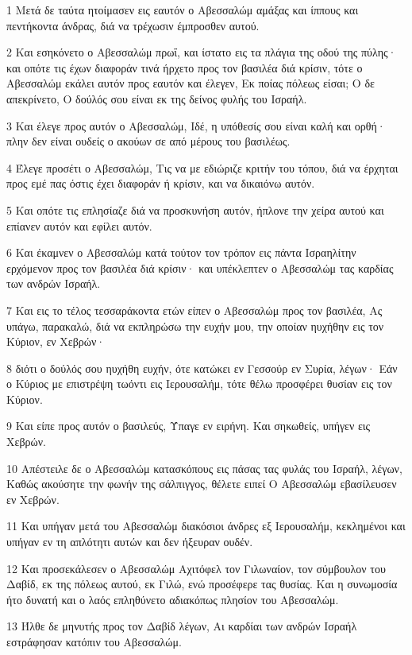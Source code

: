 \par 1 Μετά δε ταύτα ητοίμασεν εις εαυτόν ο Αβεσσαλώμ αμάξας και ίππους και πεντήκοντα άνδρας, διά να τρέχωσιν έμπροσθεν αυτού.
\par 2 Και εσηκόνετο ο Αβεσσαλώμ πρωΐ, και ίστατο εις τα πλάγια της οδού της πύλης· και οπότε τις έχων διαφοράν τινά ήρχετο προς τον βασιλέα διά κρίσιν, τότε ο Αβεσσαλώμ εκάλει αυτόν προς εαυτόν και έλεγεν, Εκ ποίας πόλεως είσαι; Ο δε απεκρίνετο, Ο δούλός σου είναι εκ της δείνος φυλής του Ισραήλ.
\par 3 Και έλεγε προς αυτόν ο Αβεσσαλώμ, Ιδέ, η υπόθεσίς σου είναι καλή και ορθή· πλην δεν είναι ουδείς ο ακούων σε από μέρους του βασιλέως.
\par 4 Έλεγε προσέτι ο Αβεσσαλώμ, Τις να με εδιώριζε κριτήν του τόπου, διά να έρχηται προς εμέ πας όστις έχει διαφοράν ή κρίσιν, και να δικαιόνω αυτόν.
\par 5 Και οπότε τις επλησίαζε διά να προσκυνήση αυτόν, ήπλονε την χείρα αυτού και επίανεν αυτόν και εφίλει αυτόν.
\par 6 Και έκαμνεν ο Αβεσσαλώμ κατά τούτον τον τρόπον εις πάντα Ισραηλίτην ερχόμενον προς τον βασιλέα διά κρίσιν· και υπέκλεπτεν ο Αβεσσαλώμ τας καρδίας των ανδρών Ισραήλ.
\par 7 Και εις το τέλος τεσσαράκοντα ετών είπεν ο Αβεσσαλώμ προς τον βασιλέα, Ας υπάγω, παρακαλώ, διά να εκπληρώσω την ευχήν μου, την οποίαν ηυχήθην εις τον Κύριον, εν Χεβρών·
\par 8 διότι ο δούλός σου ηυχήθη ευχήν, ότε κατώκει εν Γεσσούρ εν Συρία, λέγων· Εάν ο Κύριος με επιστρέψη τωόντι εις Ιερουσαλήμ, τότε θέλω προσφέρει θυσίαν εις τον Κύριον.
\par 9 Και είπε προς αυτόν ο βασιλεύς, Ύπαγε εν ειρήνη. Και σηκωθείς, υπήγεν εις Χεβρών.
\par 10 Απέστειλε δε ο Αβεσσαλώμ κατασκόπους εις πάσας τας φυλάς του Ισραήλ, λέγων, Καθώς ακούσητε την φωνήν της σάλπιγγος, θέλετε ειπεί Ο Αβεσσαλώμ εβασίλευσεν εν Χεβρών.
\par 11 Και υπήγαν μετά του Αβεσσαλώμ διακόσιοι άνδρες εξ Ιερουσαλήμ, κεκλημένοι και υπήγαν εν τη απλότητι αυτών και δεν ήξευραν ουδέν.
\par 12 Και προσεκάλεσεν ο Αβεσσαλώμ Αχιτόφελ τον Γιλωναίον, τον σύμβουλον του Δαβίδ, εκ της πόλεως αυτού, εκ Γιλώ, ενώ προσέφερε τας θυσίας. Και η συνωμοσία ήτο δυνατή και ο λαός επληθύνετο αδιακόπως πλησίον του Αβεσσαλώμ.
\par 13 Ήλθε δε μηνυτής προς τον Δαβίδ λέγων, Αι καρδίαι των ανδρών Ισραήλ εστράφησαν κατόπιν του Αβεσσαλώμ.
